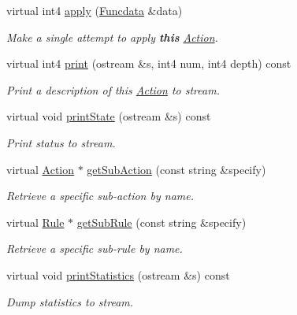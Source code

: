 \begin{DoxyCompactItemize}
virtual int4 \mbox{\hyperlink{class_action_group_aaaab0b0f5c7a14752cd57478de2e9290}{apply}} (\mbox{\hyperlink{class_funcdata}{Funcdata}} \&data)
\begin{DoxyCompactList}\small\item\em Make a single attempt to apply {\bfseries{this}} \mbox{\hyperlink{class_action}{Action}}. \end{DoxyCompactList}\item 
virtual int4 \mbox{\hyperlink{class_action_group_a41f7962b522cfbcc68c20991f5fcc4f3}{print}} (ostream \&s, int4 num, int4 depth) const
\begin{DoxyCompactList}\small\item\em Print a description of this \mbox{\hyperlink{class_action}{Action}} to stream. \end{DoxyCompactList}\item 
virtual void \mbox{\hyperlink{class_action_group_af5e07efb4a443cd74b57083a0fd57c02}{print\+State}} (ostream \&s) const
\begin{DoxyCompactList}\small\item\em Print status to stream. \end{DoxyCompactList}\item 
virtual \mbox{\hyperlink{class_action}{Action}} $\ast$ \mbox{\hyperlink{class_action_group_a5bf70e0947c75bb1e0c106f436027531}{get\+Sub\+Action}} (const string \&specify)
\begin{DoxyCompactList}\small\item\em Retrieve a specific sub-\/action by name. \end{DoxyCompactList}\item 
virtual \mbox{\hyperlink{class_rule}{Rule}} $\ast$ \mbox{\hyperlink{class_action_group_acf178e5772a5fba9fb8f11e8dadba126}{get\+Sub\+Rule}} (const string \&specify)
\begin{DoxyCompactList}\small\item\em Retrieve a specific sub-\/rule by name. \end{DoxyCompactList}\item 
virtual void \mbox{\hyperlink{class_action_group_ac61fd44348c6eabee0ebba16dfc4ff3b}{print\+Statistics}} (ostream \&s) const
\begin{DoxyCompactList}\small\item\em Dump statistics to stream. \end{DoxyCompactList}\end{DoxyCompactItemize}
